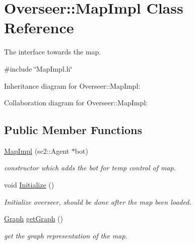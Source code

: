 \hypertarget{classOverseer_1_1MapImpl}{}\section{Overseer\+:\+:Map\+Impl Class Reference}
\label{classOverseer_1_1MapImpl}


The interface towards the map.  




{\ttfamily \#include \char`\"{}Map\+Impl.\+h\char`\"{}}



Inheritance diagram for Overseer\+:\+:Map\+Impl\+:


Collaboration diagram for Overseer\+:\+:Map\+Impl\+:
\subsection*{Public Member Functions}
\begin{DoxyCompactItemize}
\item 
\hyperlink{classOverseer_1_1MapImpl_a9c30887c6f342971fabd54d23b36a765}{Map\+Impl} (sc2\+::\+Agent $\ast$bot)
\begin{DoxyCompactList}\small\item\em constructor which adds the bot for temp control of map. \end{DoxyCompactList}\item 
void \hyperlink{classOverseer_1_1MapImpl_a5ec5b37d1ae07732a99845bfbbfce016}{Initialize} ()\hypertarget{classOverseer_1_1MapImpl_a5ec5b37d1ae07732a99845bfbbfce016}{}\label{classOverseer_1_1MapImpl_a5ec5b37d1ae07732a99845bfbbfce016}

\begin{DoxyCompactList}\small\item\em Initialize overseer, should be done after the map been loaded. \end{DoxyCompactList}\item 
\hyperlink{classOverseer_1_1Graph}{Graph} \hyperlink{classOverseer_1_1MapImpl_abedbb01faa88ff9bd3f8cd2dbec0dead}{get\+Graph} ()\hypertarget{classOverseer_1_1MapImpl_abedbb01faa88ff9bd3f8cd2dbec0dead}{}\label{classOverseer_1_1MapImpl_abedbb01faa88ff9bd3f8cd2dbec0dead}

\begin{DoxyCompactList}\small\item\em get the graph representation of the map. \end{DoxyCompactList}\end{DoxyCompactItemize}
